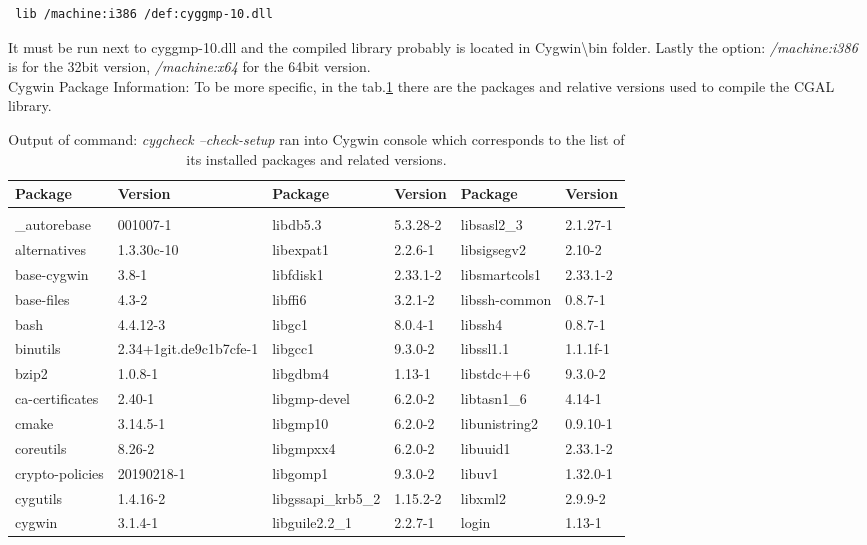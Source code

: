 \documentclass[11pt, english, openany]{report}
\begin{document}
\begin{appendices}
\begin{itemize}
\begin{lstlisting}
 lib /machine:i386 /def:cyggmp-10.dll 
\end{lstlisting}
It must be run next to cyggmp-10.dll and the compiled library probably is located in Cygwin\textbackslash bin folder.
Lastly the option: \textit{/machine:i386} is for the 32bit version, \textit{/machine:x64} for the 64bit version. \\
\newline
Cygwin Package Information: To be more specific, in the tab.\ref{tab:packages} there are the packages and relative versions used to compile the CGAL library.
\begin{table}[h]
\scriptsize
	\begin{center}
		\caption{Output of command: \textit{cygcheck --check-setup} ran into Cygwin console which corresponds to the list of its installed packages and related versions.}
		\label{tab:packages}
		\begin{tabular}{ll|ll|ll}
			Package & Version & Package & Version & Package & Version \\ \hline
			&&&&& \\
			\_autorebase & 001007-1 & 	libdb5.3 & 5.3.28-2 & 	libsasl2\_3 & 2.1.27-1 \\
			alternatives & 1.3.30c-10 & 	libexpat1 & 2.2.6-1 & 	libsigsegv2 & 2.10-2 \\
			base-cygwin & 3.8-1 & 	libfdisk1 & 2.33.1-2 & 	libsmartcols1 & 2.33.1-2 \\
			base-files & 4.3-2 & 	libffi6 & 3.2.1-2 & 	libssh-common & 0.8.7-1 \\
			bash & 4.4.12-3 & 	libgc1 & 8.0.4-1 & 	libssh4 & 0.8.7-1 \\
			binutils & 2.34+1git.de9c1b7cfe-1 & 	libgcc1 & 9.3.0-2 & 	libssl1.1 & 1.1.1f-1 \\
			bzip2 & 1.0.8-1 & 	libgdbm4 & 1.13-1 & 	libstdc++6 & 9.3.0-2 \\
			ca-certificates & 2.40-1 & 	libgmp-devel & 6.2.0-2 & 	libtasn1\_6 & 4.14-1 \\
			cmake & 3.14.5-1 & 	libgmp10 & 6.2.0-2 & 	libunistring2 & 0.9.10-1 \\
			coreutils & 8.26-2 & 	libgmpxx4 & 6.2.0-2 & 	libuuid1 & 2.33.1-2 \\
			crypto-policies & 20190218-1 & 	libgomp1 & 9.3.0-2 & 	libuv1 & 1.32.0-1 \\
			cygutils & 1.4.16-2 & 	libgssapi\_krb5\_2 & 1.15.2-2 & 	libxml2 & 2.9.9-2 \\
			cygwin & 3.1.4-1 & 	libguile2.2\_1 & 2.2.7-1 & 	login & 1.13-1 \\

\end{tabular}
\end{center}
\end{table}
\end{itemize}
\end{appendices}
\end{document}
